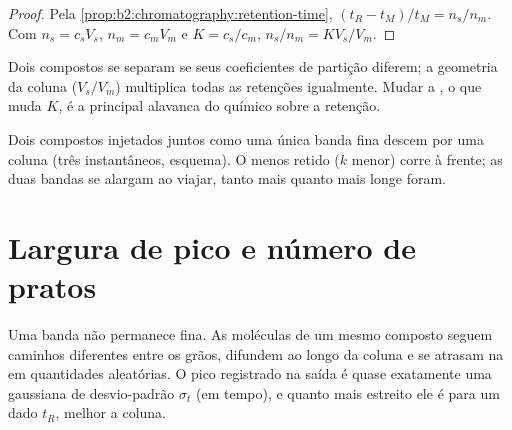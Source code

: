 \begin{proof}
Pela \cref{prop:b2:chromatography:retention-time}, $(t_R - t_M)/t_M = n_s/n_m$. Com $n_s = c_sV_s$,
$n_m = c_mV_m$ e $K = c_s/c_m$, $n_s/n_m = KV_s/V_m$.
\end{proof}

Dois compostos se separam se seus coeficientes de partição diferem; a geometria da coluna ($V_s/V_m$)
multiplica todas as retenções igualmente. Mudar a , o que muda $K$, é a principal alavanca
do químico sobre a retenção.

\begin{omfigure}
\par\vspace{4pt}

{\small Dois compostos injetados juntos como uma única banda fina descem por uma coluna (três
instantâneos, esquema). O menos retido ($k$ menor) corre à frente; as duas bandas se alargam ao viajar,
tanto mais quanto mais longe foram.}
\end{omfigure}

\section{Largura de pico e número de pratos}

Uma banda não permanece fina. As moléculas de um mesmo composto seguem caminhos diferentes entre os
grãos, difundem ao longo da coluna e se atrasam na  em quantidades aleatórias. O pico
registrado na saída é quase exatamente uma gaussiana de desvio-padrão $\sigma_t$ (em tempo), e quanto
mais estreito ele é para um dado $t_R$, melhor a coluna.

